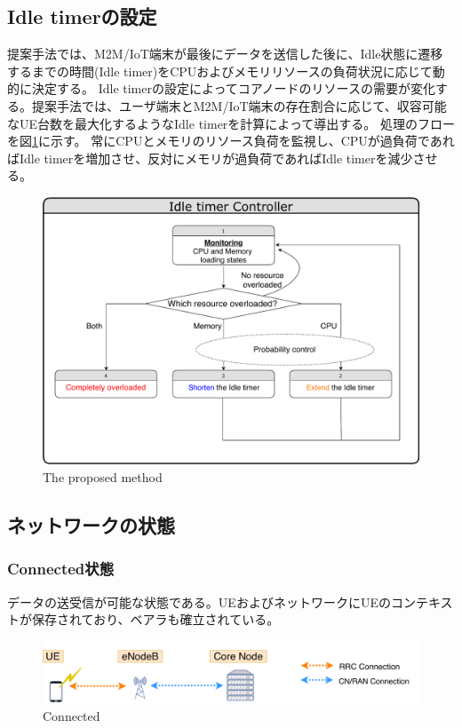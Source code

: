 \documentclass[a4j]{ujarticle}
\begin{document}
\subsection{Idle timerの設定}
  提案手法では、M2M/IoT端末が最後にデータを送信した後に、Idle状態に遷移するまでの時間(Idle timer)をCPUおよびメモリリソースの負荷状況に応じて動的に決定する。
  Idle timerの設定によってコアノードのリソースの需要が変化する。提案手法では、ユーザ端末とM2M/IoT端末の存在割合に応じて、収容可能なUE台数を最大化するようなIdle timerを計算によって導出する。
  処理のフローを図\ref{proposed_method}に示す。
  常にCPUとメモリのリソース負荷を監視し、CPUが過負荷であればIdle timerを増加させ、反対にメモリが過負荷であればIdle timerを減少させる。
  \begin{figure}[htbp]
    \centering
    \includegraphics[width=0.7\hsize]{proposed_method.pdf}
    \caption{The proposed method}
    \label{proposed_method}
  \end{figure}

  \clearpage
  \subsection{ネットワークの状態}
  \subsubsection{Connected状態}
    データの送受信が可能な状態である。UEおよびネットワークにUEのコンテキストが保存されており、ベアラも確立されている。
    \begin{figure}[htbp]
      \centering
      \includegraphics[width=0.7\hsize]{Connected.pdf}
      \caption{Connected}
      \label{Connected}
    \end{figure}
\end{document}
